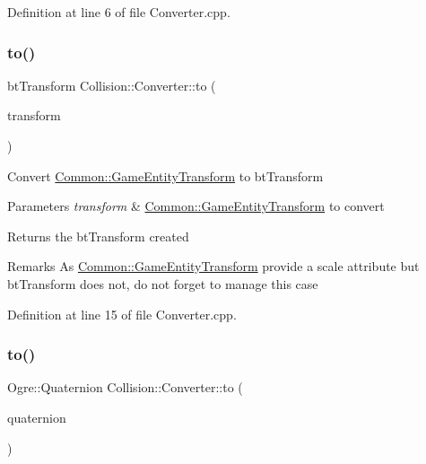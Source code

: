 Definition at line 6 of file Converter.\+cpp.

\mbox{\label{class_collision_1_1_converter_a532db90a9789b9fdabe21bd5e8f0fcfc}} 
\subsubsection{\texorpdfstring{to()}{to()}\hspace{0.1cm}{\footnotesize\ttfamily [2/6]}}
{\footnotesize\ttfamily bt\+Transform Collision\+::\+Converter\+::to (\begin{DoxyParamCaption}\item[{const \hyperlink{struct_common_1_1_game_entity_transform}{Common\+::\+Game\+Entity\+Transform} \&}]{transform }\end{DoxyParamCaption})\hspace{0.3cm}{\ttfamily [static]}}

Convert \hyperlink{struct_common_1_1_game_entity_transform}{Common\+::\+Game\+Entity\+Transform} to bt\+Transform 
\begin{DoxyParams}{Parameters}
{\em transform} & \hyperlink{struct_common_1_1_game_entity_transform}{Common\+::\+Game\+Entity\+Transform} to convert \\
\hline
\end{DoxyParams}
\begin{DoxyReturn}{Returns}
the bt\+Transform created 
\end{DoxyReturn}
\begin{DoxyRemark}{Remarks}
As \hyperlink{struct_common_1_1_game_entity_transform}{Common\+::\+Game\+Entity\+Transform} provide a scale attribute but bt\+Transform does not, do not forget to manage this case 
\end{DoxyRemark}


Definition at line 15 of file Converter.\+cpp.

\mbox{\label{class_collision_1_1_converter_a303519e4c318cca485ca02399b6a1ed3}} 
\subsubsection{\texorpdfstring{to()}{to()}\hspace{0.1cm}{\footnotesize\ttfamily [3/6]}}
{\footnotesize\ttfamily Ogre\+::\+Quaternion Collision\+::\+Converter\+::to (\begin{DoxyParamCaption}\item[{const bt\+Quaternion \&}]{quaternion }\end{DoxyParamCaption})\hspace{0.3cm}{\ttfamily [static]}}

